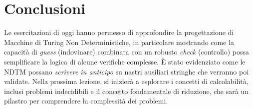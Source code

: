 \documentclass[a4paper]{article}
\theoremstyle{definition} %
\begin{document}
\section{Conclusioni}
Le esercitazioni di oggi hanno permesso di approfondire la progettazione di Macchine di Turing Non Deterministiche, in particolare mostrando come la capacità di \textit{guess} (indovinare) combinata con un robusto \textit{check} (controllo) possa semplificare la logica di alcune verifiche complesse. È stato evidenziato come le NDTM possano \textit{scrivere in anticipo} su nastri ausiliari stringhe che verranno poi validate.
Nella prossima lezione, si inizierà a esplorare i concetti di calcolabilità, inclusi problemi indecidibili e il concetto fondamentale di riduzione, che sarà un pilastro per comprendere la complessità dei problemi.
\end{document}
